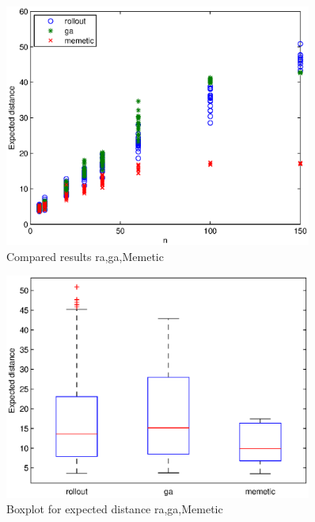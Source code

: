 \begin{figure}[!htbp]
  \begin{center}
   \includegraphics[width=0.9\textwidth]{Images/Chapter5/comparative_results.eps}
  \end{center}
    \caption{Compared results ra,ga,Memetic}\label{fig:comparative_results}
\end{figure}

\begin{figure}[!htbp]
  \begin{center}
   \includegraphics[width=0.9\textwidth]{Images/Chapter5/comparative_results_box.eps}
  \end{center}
    \caption{Boxplot for expected distance ra,ga,Memetic}\label{fig:comparative_results_box}
\end{figure}



